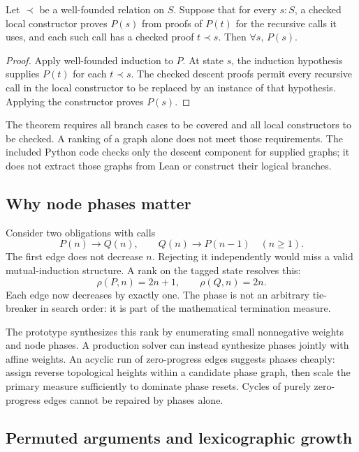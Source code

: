 \begin{theorem}\label{thm:cyclic}
Let $\prec$ be a well-founded relation on $S$. Suppose that for every $s:S$,
a checked local constructor proves $P(s)$ from proofs of $P(t)$ for the recursive
calls it uses, and each such call has a checked proof $t\prec s$. Then
$\forall s,\,P(s)$.
\end{theorem}
\begin{proof}
Apply well-founded induction to $P$. At state $s$, the induction hypothesis
supplies $P(t)$ for each $t\prec s$. The checked descent proofs permit every
recursive call in the local constructor to be replaced by an instance of that
hypothesis. Applying the constructor proves $P(s)$.
\end{proof}

The theorem requires all branch cases to be covered and all local constructors
to be checked. A ranking of a graph alone does not meet those requirements.
The included Python code checks only the descent component for supplied graphs;
it does not extract those graphs from Lean or construct their logical branches.

\subsection{Why node phases matter}

Consider two obligations with calls
\[
 P(n)\longrightarrow Q(n),\qquad
 Q(n)\longrightarrow P(n-1)\quad(n\ge1).
\]
The first edge does not decrease $n$. Rejecting it independently would miss a
valid mutual-induction structure. A rank on the tagged state resolves this:
\[
 \rho(P,n)=2n+1,\qquad \rho(Q,n)=2n.
\]
Each edge now decreases by exactly one. The phase is not an arbitrary tie-breaker
in search order: it is part of the mathematical termination measure.

The prototype synthesizes this rank by enumerating small nonnegative weights
and node phases. A production solver can instead synthesize phases jointly with
affine weights. An acyclic run of zero-progress edges suggests phases cheaply:
assign reverse topological heights within a candidate phase graph, then scale
the primary measure sufficiently to dominate phase resets. Cycles of purely
zero-progress edges cannot be repaired by phases alone.

\subsection{Permuted arguments and lexicographic growth}

